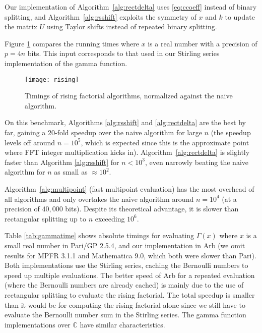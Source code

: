 \documentclass{sig-alternate}
\begin{document}
Our implementation of Algorithm~\ref{alg:rectdelta} uses \eqref{eq:ccoeff}
instead of binary splitting, and Algorithm~\ref{alg:rsshift}
exploits the symmetry of $x$ and $k$ to update the
matrix $U$ using Taylor shifts instead of repeated binary splitting.

Figure \ref{fig:rising} compares the running times where $x$
is a real number with a precision of $p = 4n$ bits. This input
corresponds to that used in our Stirling series implementation
of the gamma function.

\begin{figure}[width=8cm] \label{fig:rising}
\begin{center}
\texttt{[image: rising]}
\caption{Timings of rising factorial algorithms, normalized
against the naive algorithm.}
\end{center}
\end{figure}

On this benchmark, Algorithms \ref{alg:rsshift} and \ref{alg:rectdelta} are the
best by far, gaining a 20-fold speedup over the naive algorithm for large $n$
(the speedup levels off
around $n = 10^5$, which is expected since this is
the approximate point where FFT integer multiplication kicks in).
Algorithm~\ref{alg:rectdelta} is slightly faster than Algorithm \ref{alg:rsshift}
for $n < 10^3$, even narrowly beating the naive algorithm for
$n$ as small as $\approx 10^2$.

Algorithm~\ref{alg:multipoint} (fast multipoint evaluation)
has the most overhead of all algorithms and only overtakes
the naive algorithm around $n = 10^4$ (at a precision of $40,000$ bits).
Despite its theoretical advantage, it is slower than rectangular splitting
up to $n$ exceeding $10^6$.

Table \ref{tab:gammatime} shows absolute timings for evaluating $\Gamma(x)$
where $x$ is a small real number in Pari/GP 2.5.4, and our implementation
in Arb (we omit results for MPFR 3.1.1 and Mathematica 9.0, which
both were slower than Pari).
Both implementations use the Stirling series, caching
the Bernoulli numbers to speed up multiple evaluations.
The better speed of Arb for a repeated evaluation (where the Bernoulli numbers
are already cached) is mainly due to the use of rectangular splitting
to evaluate the rising factorial.
The total speedup is smaller than it would be for computing the
rising factorial alone since we still have to evaluate the Bernoulli
number sum in the Stirling series.
The gamma function implementations
over $\mathbb{C}$ have similar characteristics.
\end{document}
